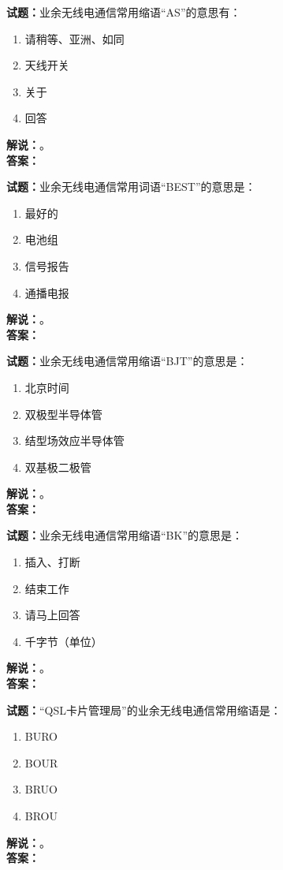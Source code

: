 \documentclass{ctexbook}
\begin{document}
\bigskip

\noindent\textbf{试题：}业余无线电通信常用缩语“AS”的意思有：
\begin{enumerate}[leftmargin=3em]
  \item 请稍等、亚洲、如同
  \item 天线开关
  \item 关于
  \item 回答
\end{enumerate}
\noindent\textbf{解说：}\textbf{}。\\\noindent\textbf{答案：}

\bigskip

\noindent\textbf{试题：}业余无线电通信常用词语“BEST”的意思是：
\begin{enumerate}[leftmargin=3em]
  \item 最好的
  \item 电池组
  \item 信号报告
  \item 通播电报
\end{enumerate}
\noindent\textbf{解说：}\textbf{}。\\\noindent\textbf{答案：}

\bigskip

\noindent\textbf{试题：}业余无线电通信常用缩语“BJT”的意思是：
\begin{enumerate}[leftmargin=3em]
  \item 北京时间
  \item 双极型半导体管
  \item 结型场效应半导体管
  \item 双基极二极管
\end{enumerate}
\noindent\textbf{解说：}\textbf{}。\\\noindent\textbf{答案：}

\bigskip

\noindent\textbf{试题：}业余无线电通信常用缩语“BK”的意思是：
\begin{enumerate}[leftmargin=3em]
  \item 插入、打断
  \item 结束工作
  \item 请马上回答
  \item 千字节（单位）
\end{enumerate}
\noindent\textbf{解说：}\textbf{}。\\\noindent\textbf{答案：}

\bigskip

\noindent\textbf{试题：}“QSL卡片管理局”的业余无线电通信常用缩语是：
\begin{enumerate}[leftmargin=3em]
  \item BURO
  \item BOUR
  \item BRUO
  \item BROU
\end{enumerate}
\noindent\textbf{解说：}\textbf{}。\\\noindent\textbf{答案：}
\end{document}
